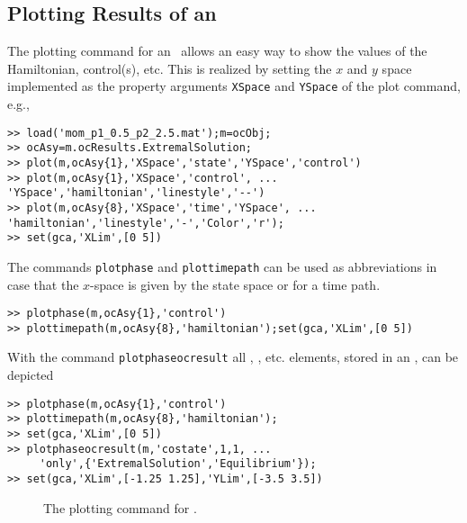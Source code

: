 \subsection{Plotting Results of an \ocmodel}
The plotting command for an \ocmodel\ allows an easy way to show the values of the Hamiltonian, control(s), etc. This is realized by setting the $x$ and $y$ space implemented as the property arguments \lstinline+XSpace+ and  \lstinline+YSpace+ of the plot command, e.g.,
\begin{lstlisting}
>> load('mom_p1_0.5_p2_2.5.mat');m=ocObj;
>> ocAsy=m.ocResults.ExtremalSolution;
>> plot(m,ocAsy{1},'XSpace','state','YSpace','control')
>> plot(m,ocAsy{1},'XSpace','control', ...
'YSpace','hamiltonian','linestyle','--')
>> plot(m,ocAsy{8},'XSpace','time','YSpace', ...
'hamiltonian','linestyle','-','Color','r');
>> set(gca,'XLim',[0 5])
\end{lstlisting}
The commands \lstinline+plotphase+ and \lstinline+plottimepath+ can be used as abbreviations in case that the $x$-space is given by the state space or for a time path.
\begin{lstlisting}
>> plotphase(m,ocAsy{1},'control')
>> plottimepath(m,ocAsy{8},'hamiltonian');set(gca,'XLim',[0 5])
\end{lstlisting}
With the command \lstinline+plotphaseocresult+ all \octrajectory, \dynprimitive, etc. elements, stored in an \ocmodel, can be depicted
\begin{lstlisting}
>> plotphase(m,ocAsy{1},'control')
>> plottimepath(m,ocAsy{8},'hamiltonian');
>> set(gca,'XLim',[0 5])
>> plotphaseocresult(m,'costate',1,1, ...
     'only',{'ExtremalSolution','Equilibrium'});
>> set(gca,'XLim',[-1.25 1.25],'YLim',[-3.5 3.5])
\end{lstlisting}
\begin{figure}
\centering
	\goodgap
	\goodgap
	\goodgap
	\label{fig:plot02}
	\caption{The plotting command for \ocmodel.}
\end{figure}
